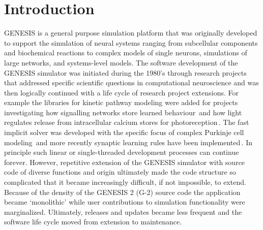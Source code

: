 \documentclass[12pt]{article}
\begin{document}
\section{Introduction}

GENESIS is a general purpose simulation platform that was originally
developed to support the simulation of neural systems ranging from
subcellular components and biochemical reactions to complex models of
single neurons, simulations of large networks, and systems-level
models.
The software development of the GENESIS simulator was initiated during
the 1980's through research projects that addressed specific
scientific questions in computational neuroscience and was then
logically continued with a life cycle of research project extensions.
For example the libraries for kinetic pathway modeling were added for
projects investigating how signalling networks store learned
behaviour\,\cite{bhalla99:_emerg} and how light regulates release from
intracellular calcium stores for
photoreception\,\cite{blackwell00:_eviden_distin_light_induc_calcium}.
The fast implicit solver was developed with the specific focus of
complex Purkinje cell modeling\,\cite{deschutter94:_purkin_i,
  deschutter94:_purkin_ii} and more recently synaptic learning rules
have been implemented\,\cite{guenay08:_chann_densit_distr_explain_spikin}.  In
principle such linear or single-threaded development processes can
continue forever.  However, repetitive extension of the GENESIS
simulator with source code of diverse functions and origin
ultimately made the code structure so complicated that it became increasingly
difficult, if not impossible, to extend.  Because of the density of
the GENESIS 2 (G-2) source code the application became
`monolithic' while user contributions to simulation
functionality were marginalized. Ultimately, releases and updates became less frequent and the software life cycle moved from extension to maintenance.

\end{document}
